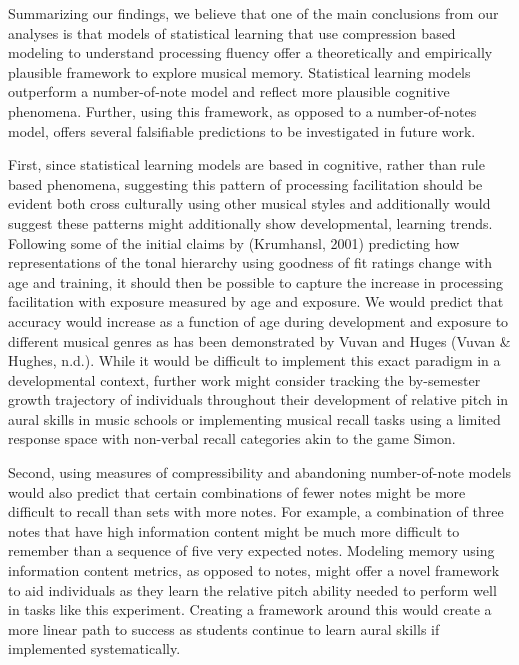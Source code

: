 \documentclass[english,man]{apa6}
\begin{document}
Summarizing our findings, we believe that one of the main conclusions from our analyses is that models of statistical learning that use compression based modeling to understand processing fluency offer a theoretically and empirically plausible framework to explore musical memory.
Statistical learning models outperform a number-of-note model and reflect more plausible cognitive phenomena.
Further, using this framework, as opposed to a number-of-notes model, offers several falsifiable predictions to be investigated in future work.

First, since statistical learning models are based in cognitive, rather than rule based phenomena, suggesting this pattern of processing facilitation should be evident both cross culturally using other musical styles and additionally would suggest these patterns might additionally show developmental, learning trends.
Following some of the initial claims by (Krumhansl, 2001) predicting how representations of the tonal hierarchy using goodness of fit ratings change with age and training, it should then be possible to capture the increase in processing facilitation with exposure measured by age and exposure.
We would predict that accuracy would increase as a function of age during development and exposure to different musical genres as has been demonstrated by Vuvan and Huges (Vuvan \& Hughes, n.d.).
While it would be difficult to implement this exact paradigm in a developmental context, further work might consider tracking the by-semester growth trajectory of individuals throughout their development of relative pitch in aural skills in music schools or implementing musical recall tasks using a limited response space with non-verbal recall categories akin to the game Simon.

Second, using measures of compressibility and abandoning number-of-note models would also predict that certain combinations of fewer notes might be more difficult to recall than sets with more notes.
For example, a combination of three notes that have high information content might be much more difficult to remember than a sequence of five very expected notes. Modeling memory using information content metrics, as opposed to notes, might offer a novel framework to aid individuals as they learn the relative pitch ability needed to perform well in tasks like this experiment.
Creating a framework around this would create a more linear path to success as students continue to learn aural skills if implemented systematically.
\end{document}
